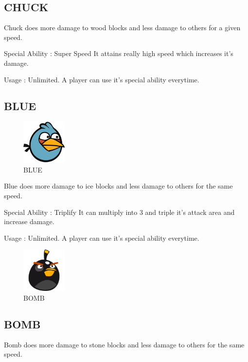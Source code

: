 \documentclass{article}
\begin{document}
\subsection{CHUCK}


Chuck does more damage to wood blocks and less damage to others for a given speed.

Special Ability : Super Speed
It attains really high speed which increases it's damage.

Usage : Unlimited. A player can use it's special ability everytime.

\subsection{BLUE}
\begin{figure}[h!]
    \centering
    \includegraphics[width = 0.2\textwidth]{../Resources/small_blue.png}
    \caption{BLUE}
    \label{fig : BLUE}
\end{figure}


Blue does more damage to ice blocks and less damage to others for the same speed.

Special Ability : Triplify
It can multiply into 3 and triple it's attack area and increase damage.

Usage : Unlimited. A player can use it's special ability everytime.




\begin{figure}[h!]
    \centering
    \includegraphics[width = 0.2\textwidth]{../Resources/bomb.png}
    \caption{BOMB}
    \label{fig : BOMB}
\end{figure}
\subsection{BOMB}
Bomb does more damage to stone blocks and less damage to others for the same speed.
\end{document}
